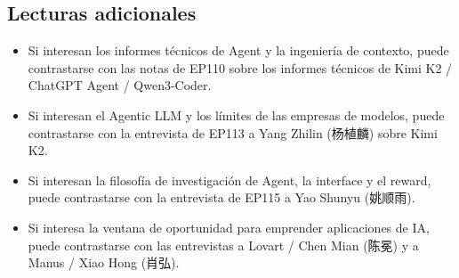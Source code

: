 \subsection{Lecturas adicionales}

\begin{itemize}
\item Si interesan los informes técnicos de Agent y la ingeniería de contexto, puede contrastarse con las notas de EP110 sobre los informes técnicos de Kimi K2 / ChatGPT Agent / Qwen3-Coder.
\item Si interesan el Agentic LLM y los límites de las empresas de modelos, puede contrastarse con la entrevista de EP113 a Yang Zhilin (杨植麟) sobre Kimi K2.
\item Si interesan la filosofía de investigación de Agent, la interface y el reward, puede contrastarse con la entrevista de EP115 a Yao Shunyu (姚顺雨).
\item Si interesa la ventana de oportunidad para emprender aplicaciones de IA, puede contrastarse con las entrevistas a Lovart / Chen Mian (陈冕) y a Manus / Xiao Hong (肖弘).
\end{itemize}


